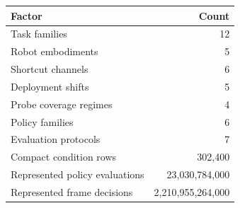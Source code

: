 \begin{tabular}{lr}
\toprule
Factor & Count \\
\midrule
Task families & 12 \\
Robot embodiments & 5 \\
Shortcut channels & 6 \\
Deployment shifts & 5 \\
Probe coverage regimes & 4 \\
Policy families & 6 \\
Evaluation protocols & 7 \\
Compact condition rows & 302,400 \\
Represented policy evaluations & 23,030,784,000 \\
Represented frame decisions & 2,210,955,264,000 \\
\bottomrule
\end{tabular}
